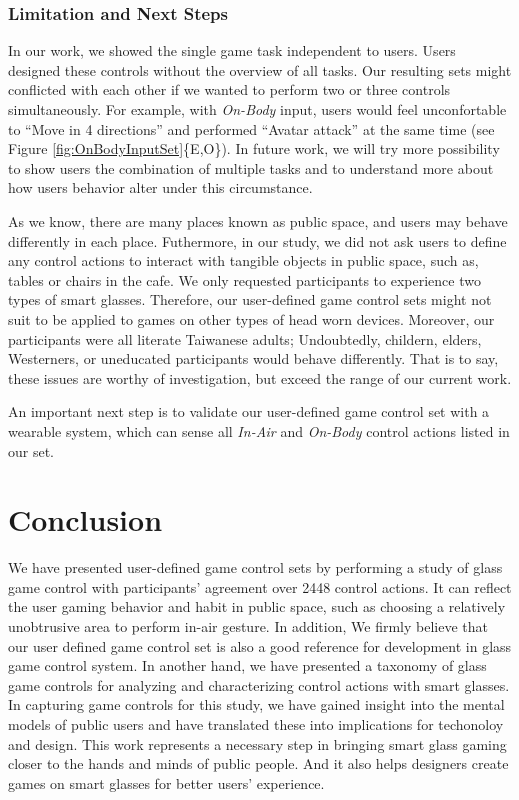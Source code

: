 \documentclass{sigchi}
\begin{document}
  \subsubsection{Limitation and Next Steps}

  In our work, we showed the single game task independent to users. Users designed these controls without the overview of all tasks. Our resulting sets might conflicted with each other if we wanted to perform two or three controls simultaneously. For example, with \emph{On-Body} input, users would feel unconfortable to ``Move in 4 directions'' and performed ``Avatar attack'' at the same time (see Figure \ref{fig:OnBodyInputSet}\{E,O\}). In future work, we will try more possibility to show users the combination of multiple tasks and to understand more about how users behavior alter under this circumstance.

  As we know, there are many places known as public space, and users may behave differently in each place. Futhermore, in our study, we did not ask users to define any control actions to interact with tangible objects in public space, such as, tables or chairs in the cafe. We only requested participants to experience two types of smart glasses. Therefore, our user-defined game control sets might not suit to be applied to games on other types of head worn devices. Moreover, our participants were all literate Taiwanese adults; Undoubtedly, childern, elders, Westerners, or uneducated participants would behave differently. That is to say, these issues are worthy of investigation, but exceed the range of our current work.

  An important next step is to validate our user-defined game control set with a wearable system, which can sense all \emph{In-Air} and \emph{On-Body} control actions listed in our set.   


\section{Conclusion}

We have presented user-defined game control sets by performing a study of glass game control with participants' agreement over 2448 control actions.
It can reflect the user gaming behavior and habit in public space, such as choosing a relatively unobtrusive area to perform in-air gesture. In addition, We firmly believe that our user defined game control set is also a good reference for development in glass game control system. In another hand, we have presented a taxonomy of glass game controls for analyzing and characterizing control actions with smart glasses. 
In capturing game controls for this study, we have gained insight into the mental models of public users and have translated these into implications for techonoloy and design. 
This work represents a necessary step in bringing smart glass gaming closer to the hands and minds of public people. And it also helps designers create games on smart glasses for better users' experience.
\end{document}
